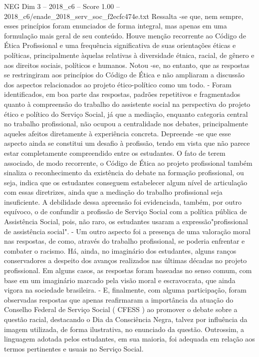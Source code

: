 \begin{textsample}{NEG Dim 3 – 2018\_c6 – Score 1.00 – 2018\_c6/enade\_2018\_serv\_soc\_f2ecfc474e.txt}
Ressalta -se que, nem sempre, esses princípios foram enunciados de forma integral, mas apenas em uma formulação mais geral de seu conteúdo.
Houve menção recorrente ao Código de Ética Profissional e uma frequência significativa de suas orientações éticas e políticas, principalmente àquelas relativas à diversidade étnica, racial, de gênero e aos direitos sociais, políticos e humanos.
Notou -se, no entanto, que as respostas se restringiram aos princípios do Código de Ética e não ampliaram a discussão dos aspectos relacionados ao projeto ético-político como um todo. - Foram identificados, em boa parte das respostas, padrões repetitivos e fragmentados quanto à compreensão do trabalho do assistente social na perspectiva do projeto ético e político do Serviço Social, já que a mediação, enquanto categoria central no trabalho profissional, não ocupou a centralidade nos debates, principalmente aqueles afeitos diretamente à experiência concreta.
Depreende -se que esse aspecto ainda se constitui um desafio à profissão, tendo em vista que não parece estar completamente compreendido entre os estudantes.
O fato de terem associado, de modo recorrente, o Código de Ética ao projeto profissional também sinaliza o reconhecimento da existência do debate na formação profissional, ou seja, indica que os estudantes conseguem estabelecer algum nível de articulação com essas diretrizes, ainda que a mediação do trabalho profissional seja insuficiente.
A debilidade dessa apreensão foi evidenciada, também, por outro equívoco, o de confundir a profissão de Serviço Social com a política pública de Assistência Social, pois, não raro, os estudantes usaram a expressão"profissional de assistência social". - Um outro aspecto foi a presença de uma valoração moral nas respostas, de como, através do trabalho profissional, se poderia enfrentar e combater o racismo.
Há, ainda, no imaginário dos estudantes, alguns ranços conservadores a despeito dos avanços realizados nas últimas décadas no projeto profissional.
Em alguns casos, as respostas foram baseadas no senso comum, com base em um imaginário marcado pela visão moral e escravocrata, que ainda vigora na sociedade brasileira. - E, finalmente, com alguma participação, foram observadas respostas que apenas reafirmaram a importância da atuação do Conselho Federal de Serviço Social ( CFESS ) ao promover o debate sobre a questão racial, destacando o Dia da Consciência Negra, talvez por influência da imagem utilizada, de forma ilustrativa, no enunciado da questão.
Outrossim, a linguagem adotada pelos estudantes, em sua maioria, foi adequada em relação aos termos pertinentes e usuais no Serviço Social.

\end{textsample}
